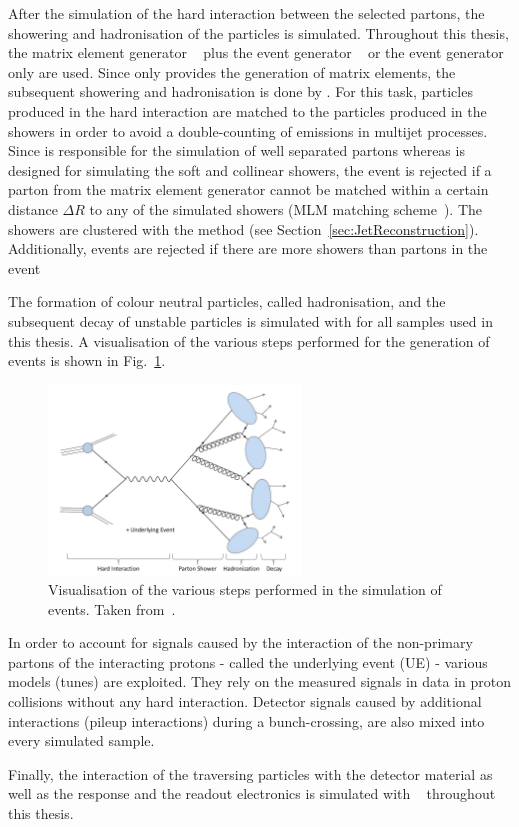 After the simulation of the hard interaction between the selected partons, the showering and hadronisation of the particles is simulated.
Throughout this thesis, the matrix element generator \madgraph~\cite{bib:Madgraph_2014} plus the event generator \pythia~\cite{bib:Pyhtia6_2006} or the event generator \pythia only are used.
Since \madgraph only provides the generation of matrix elements, the subsequent showering and hadronisation is done by \pythia.
For this task, particles produced in the hard interaction are matched to the particles produced in the showers in order to avoid a double-counting of emissions in multijet processes.
Since \madgraph is responsible for the simulation of well separated partons whereas \pythia is designed for simulating the soft and collinear showers, the event is rejected if a parton from the matrix element generator cannot be matched within a certain distance $\Delta R$ to any of the simulated showers (MLM matching scheme~\cite{bib:MLM_matching}).
The showers are clustered with the \kt method (see Section~\ref{sec:JetReconstruction}).
Additionally, events are rejected if there are more showers than partons in the event

The formation of colour neutral particles, called hadronisation, and the subsequent decay of unstable particles is simulated with \pythia for all samples used in this thesis.
A visualisation of the various steps performed for the generation of events is shown in Fig.~\ref{fig:MCsimulation}. 
\begin{figure}[!b]
  \centering
      \includegraphics[width=0.60\textwidth]{figures/experiment/Simulation/MCGeneration}
  \caption{Visualisation of the various steps performed in the simulation of events. Taken from~\cite{bib:Kristin_Thesis}.}  
  \label{fig:MCsimulation}
\end{figure}

In order to account for signals caused by the interaction of the non-primary partons of the interacting protons - called the underlying event (UE) -  various models (tunes) are exploited.
They rely on the measured signals in data in proton collisions without any hard interaction.
Detector signals caused by additional interactions (pileup interactions) during a bunch-crossing, are also mixed into every simulated sample.

Finally, the interaction of the traversing particles with the detector material as well as the response and the readout electronics is simulated with \geant~\cite{bib:Geant4_2003,bib:Geant4_2006} throughout this thesis.


